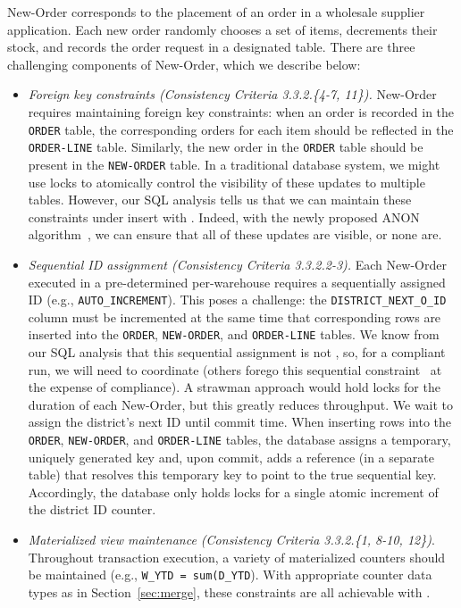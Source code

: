 New-Order corresponds to the placement of an order in a wholesale
supplier application. Each new order randomly chooses a set of items,
decrements their stock, and records the order request in a designated
table. There are three challenging components of New-Order, which we
describe below:
\begin{itemize}

\item \textit{Foreign key constraints (Consistency Criteria
  3.3.2.\{4-7, 11\}).} New-Order requires maintaining foreign key constraints:
  when an order is recorded in the \texttt{ORDER} table, the
  corresponding orders for each item should be reflected in the
  \texttt{ORDER-LINE} table. Similarly, the new order in the
  \texttt{ORDER} table should be present in the \texttt{NEW-ORDER}
  table. In a traditional database system, we might use locks to
  atomically control the visibility of these updates to multiple
  tables. However, our SQL analysis tells us that we can maintain
  these constraints under insert with \cfreedom. Indeed, with the
  newly proposed \cfree ANON algorithm~\cite{ramp-txns}, we can ensure
  that all of these updates are visible, or none are.

\item \textit{Sequential ID assignment (Consistency Criteria
  3.3.2.2-3).} Each New-Order executed in a pre-determined
  per-warehouse requires a sequentially assigned ID (e.g.,
  \texttt{AUTO\_INCREMENT}). This poses a challenge: the
  \texttt{DISTRICT\_NEXT\_O\_ID} column must be incremented at the
  same time that corresponding rows are inserted into the
  \texttt{ORDER}, \texttt{NEW-ORDER}, and \texttt{ORDER-LINE}
  tables. We know from our SQL analysis that this sequential
  assignment is not \cfree, so, for a compliant run, we will need to
  coordinate (others forego this sequential
  constraint~\cite{hat-vldb,silo} at the expense of compliance). A
  strawman approach would hold locks for the duration of each
  New-Order, but this greatly reduces throughput. We wait to assign
  the district's next ID until commit time. When inserting rows into
  the \texttt{ORDER}, \texttt{NEW-ORDER}, and \texttt{ORDER-LINE}
  tables, the database assigns a temporary, uniquely generated key
  and, upon commit, adds a reference (in a separate table) that
  resolves this temporary key to point to the true sequential
  key. Accordingly, the database only holds locks for a single atomic
  increment of the district ID counter.

\item \textit{Materialized view maintenance (Consistency Criteria
  3.3.2.\{1, 8-10, 12\})}. Throughout transaction execution, a variety
  of materialized counters should be maintained (e.g., \texttt{W\_YTD
    = sum(D\_YTD}). With appropriate counter data types as in
  Section~\ref{sec:merge}, these constraints are all achievable with
  \cfreedom.
\end{itemize}

